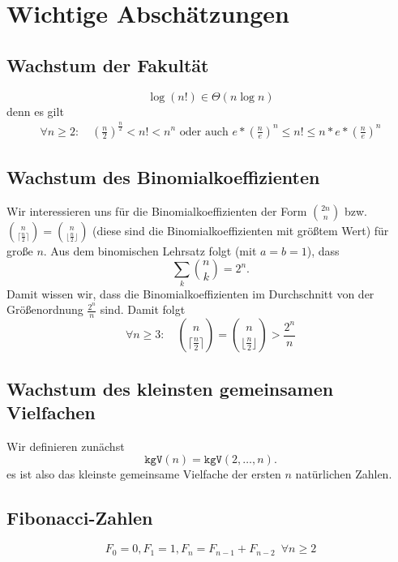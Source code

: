 \chapter{Wichtige Abschätzungen}

\section{Wachstum der Fakultät}
\begin{equation*}
	\log(n!)\in \Theta(n\log n)
\end{equation*}
denn es gilt 
\begin{align*}
	\forall n\geq 2:\quad \left(\frac n2\right)^{\frac n2} < n! < n^n \text{ oder auch } e*\left(\frac ne\right)^n\leq n!\leq n*e*\left(\frac ne\right)^n
\end{align*}

\section{Wachstum des Binomialkoeffizienten}
Wir interessieren uns für die Binomialkoeffizienten der Form $\binom{2n}{n}$ bzw. $\binom{n}{\lceil \frac n2\rceil}=\binom{n}{\lfloor \frac n2\rfloor}$ (diese sind die Binomialkoeffizienten mit größtem Wert) für große $n$.
Aus dem binomischen Lehrsatz folgt (mit $a=b=1$), dass
\begin{equation*}
	\sum_k\binom nk = 2^n.
\end{equation*}
Damit wissen wir, dass die Binomialkoeffizienten im Durchschnitt von der Größenordnung $\frac{2^n}n$ sind. Damit folgt
\begin{equation*}
	\forall n\geq 3:\quad\binom{n}{\lceil \frac n2\rceil}=\binom{n}{\lfloor \frac n2\rfloor}>\frac{2^n}n
\end{equation*}



\section{Wachstum des kleinsten gemeinsamen Vielfachen}
\newcommand{\kgV}{\texttt{kgV}}
Wir definieren zunächst
\begin{equation*}
	\kgV(n)=\kgV(2,\ldots,n).
\end{equation*}
es ist also das kleinste gemeinsame Vielfache der ersten $n$ natürlichen Zahlen.

\section{Fibonacci-Zahlen}
\begin{equation*}
	F_0 = 0, F_1=1, F_n=F_{n-1}+F_{n-2}\enspace\forall n\geq 2
\end{equation*}

